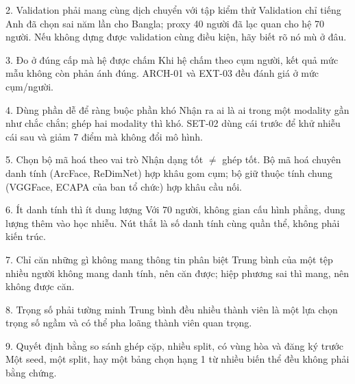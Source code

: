 \documentclass[11pt,a4paper,oneside]{report}
\begin{document}
\begin{principle}{2. Validation phải mang cùng dịch chuyển với tập kiểm thử}
Validation chỉ tiếng Anh đã chọn sai năm lần cho Bangla; proxy 40 người đã lạc quan cho hệ 70 người. Nếu không dựng được validation cùng điều kiện, hãy biết rõ nó mù ở đâu.
\end{principle}

\begin{principle}{3. Đo ở đúng cấp mà hệ được chấm}
Khi hệ chấm theo cụm người, kết quả mức mẫu không còn phản ánh đúng. ARCH-01 và EXT-03 đều đánh giá ở mức cụm/người.
\end{principle}

\begin{principle}{4. Dùng phần dễ để ràng buộc phần khó}
Nhận ra ai là ai trong một modality gần như chắc chắn; ghép hai modality thì khó. SET-02 dùng cái trước để khử nhiễu cái sau và giảm 7 điểm mà không đổi mô hình.
\end{principle}

\begin{principle}{5. Chọn bộ mã hoá theo vai trò}
Nhận dạng tốt $\ne$ ghép tốt. Bộ mã hoá chuyên danh tính (ArcFace, ReDimNet) hợp khâu gom cụm; bộ giữ thuộc tính chung (VGGFace, ECAPA của ban tổ chức) hợp khâu cầu nối.
\end{principle}

\begin{principle}{6. Ít danh tính thì ít dung lượng}
Với 70 người, không gian cấu hình phẳng, dung lượng thêm vào học nhiễu. Nút thắt là số danh tính cùng quần thể, không phải kiến trúc.
\end{principle}

\begin{principle}{7. Chỉ căn những gì không mang thông tin phân biệt}
Trung bình của một tệp nhiều người không mang danh tính, nên căn được; hiệp phương sai thì mang, nên không được căn.
\end{principle}

\begin{principle}{8. Trọng số phải tường minh}
Trung bình đều nhiều thành viên là một lựa chọn trọng số ngầm và có thể pha loãng thành viên quan trọng.
\end{principle}

\begin{principle}{9. Quyết định bằng so sánh ghép cặp, nhiều split, có vùng hòa và đăng ký trước}
Một seed, một split, hay một bảng chọn hạng 1 từ nhiều biến thể đều không phải bằng chứng.
\end{principle}
\end{document}

